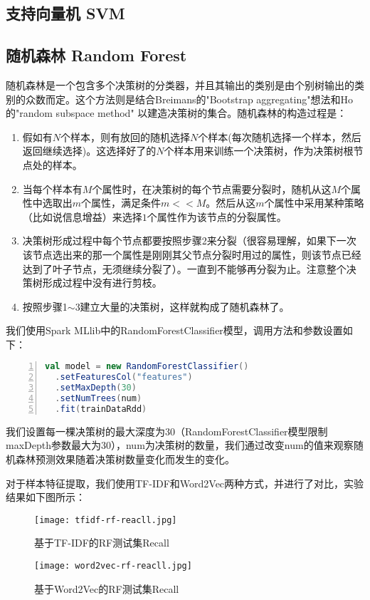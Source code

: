 \documentclass[lang=cn,11pt]{elegantpaper}
\begin{document}
\subsection{支持向量机 SVM}

\subsection{随机森林 Random Forest}
随机森林是一个包含多个决策树的分类器，并且其输出的类别是由个别树输出的类别的众数而定。这个方法则是结合Breimans的"Bootstrap aggregating"想法和Ho的"random subspace method" 以建造决策树的集合。随机森林的构造过程是：
\begin{enumerate}[1.]
  \item 假如有$N$个样本，则有放回的随机选择$N$个样本(每次随机选择一个样本，然后返回继续选择)。这选择好了的$N$个样本用来训练一个决策树，作为决策树根节点处的样本。
  \item 当每个样本有$M$个属性时，在决策树的每个节点需要分裂时，随机从这$M$个属性中选取出$m$个属性，满足条件$m << M$。然后从这$m$个属性中采用某种策略（比如说信息增益）来选择$1$个属性作为该节点的分裂属性。
  \item 决策树形成过程中每个节点都要按照步骤2来分裂（很容易理解，如果下一次该节点选出来的那一个属性是刚刚其父节点分裂时用过的属性，则该节点已经达到了叶子节点，无须继续分裂了）。一直到不能够再分裂为止。注意整个决策树形成过程中没有进行剪枝。
  \item 按照步骤1$\sim$3建立大量的决策树，这样就构成了随机森林了。
\end{enumerate}\par
我们使用Spark MLlib中的RandomForestClassifier模型，调用方法和参数设置如下：
\begin{lstlisting}[language={Scala},numbers=left,numberstyle=\tiny,%frame=shadowbox,  
  rulesepcolor=\color{red!20!green!20!blue!20},  
  keywordstyle=\color{blue!70!black},  
  commentstyle=\color{blue!90!},  
  basicstyle=\ttfamily]
  val model = new RandomForestClassifier()
  .setFeaturesCol("features")
  .setMaxDepth(30)
  .setNumTrees(num)
  .fit(trainDataRdd)
\end{lstlisting}\par
我们设置每一棵决策树的最大深度为30（RandomForestClassifier模型限制maxDepth参数最大为30），num为决策树的数量，我们通过改变num的值来观察随机森林预测效果随着决策树数量变化而发生的变化。\par
对于样本特征提取，我们使用TF-IDF和Word2Vec两种方式，并进行了对比，实验结果如下图所示：

\begin{figure}[!htbp]
  \begin{minipage}[t]{0.5\linewidth}
  \centering
  \texttt{[image: tfidf-rf-reacll.jpg]}
  \caption{基于TF-IDF的RF测试集Recall}
  \label{fig:side:a}
  \end{minipage}
  \begin{minipage}[t]{0.5\linewidth}
  \centering
  \texttt{[image: word2vec-rf-reacll.jpg]}
  \caption{基于Word2Vec的RF测试集Recall}
  \label{fig:side:b}
  \end{minipage}
  \end{figure}
\end{document}
